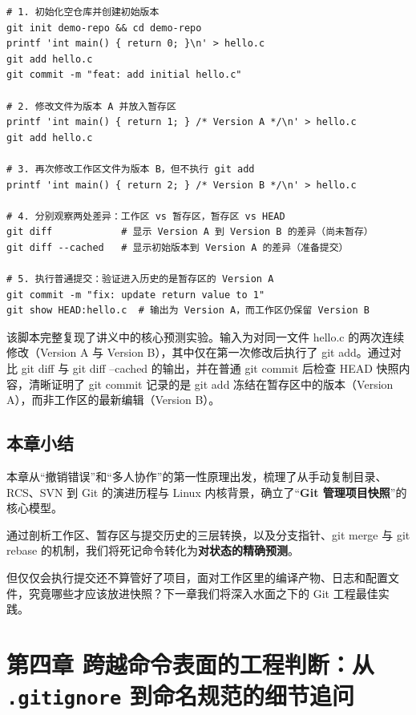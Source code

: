 \documentclass[UTF8,a4paper,11pt,fontset=fandol]{ctexart}
\begin{document}
\begin{lstlisting}[basicstyle={\ttfamily\small\linespread{1}\selectfont},captionpos=t,caption={验证工作区、暂存区与提交历史状态转换的预测实验}]
# 1. 初始化空仓库并创建初始版本
git init demo-repo && cd demo-repo
printf 'int main() { return 0; }\n' > hello.c
git add hello.c
git commit -m "feat: add initial hello.c"

# 2. 修改文件为版本 A 并放入暂存区
printf 'int main() { return 1; } /* Version A */\n' > hello.c
git add hello.c

# 3. 再次修改工作区文件为版本 B，但不执行 git add
printf 'int main() { return 2; } /* Version B */\n' > hello.c

# 4. 分别观察两处差异：工作区 vs 暂存区，暂存区 vs HEAD
git diff            # 显示 Version A 到 Version B 的差异（尚未暂存）
git diff --cached   # 显示初始版本到 Version A 的差异（准备提交）

# 5. 执行普通提交：验证进入历史的是暂存区的 Version A
git commit -m "fix: update return value to 1"
git show HEAD:hello.c  # 输出为 Version A，而工作区仍保留 Version B
\end{lstlisting}

该脚本完整复现了讲义中的核心预测实验。输入为对同一文件 hello.c 的两次连续修改（Version A 与 Version B），其中仅在第一次修改后执行了 git add。通过对比 git diff 与 git diff --cached 的输出，并在普通 git commit 后检查 HEAD 快照内容，清晰证明了 git commit 记录的是 git add 冻结在暂存区中的版本（Version A），而非工作区的最新编辑（Version B）。

\subsection{本章小结}

本章从“撤销错误”和“多人协作”的第一性原理出发，梳理了从手动复制目录、RCS、SVN 到 Git 的演进历程与 Linux 内核背景，确立了“\textbf{Git 管理项目快照}”的核心模型。

通过剖析工作区、暂存区与提交历史的三层转换，以及分支指针、git merge 与 git rebase 的机制，我们将死记命令转化为\textbf{对状态的精确预测}。

但仅仅会执行提交还不算管好了项目，面对工作区里的编译产物、日志和配置文件，究竟哪些才应该放进快照？下一章我们将深入水面之下的 Git 工程最佳实践。

\section{第四章 跨越命令表面的工程判断：从 \texttt{.gitignore} 到命名规范的细节追问}
\end{document}
